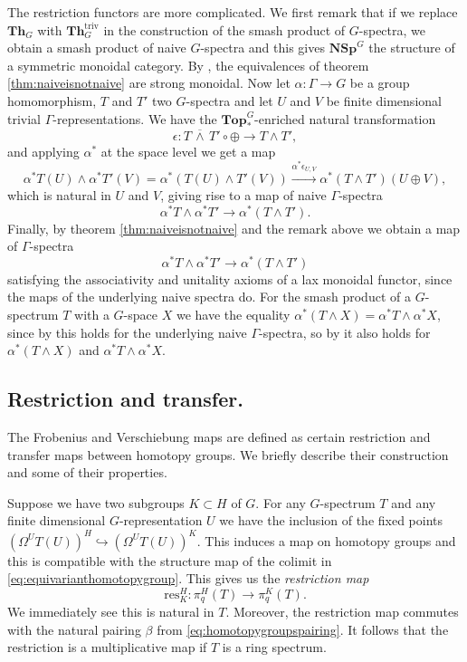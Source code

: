 The restriction functors are more complicated. We first remark that
if we replace $\mathbf{Th}_G$ with $\mathbf{Th}_G^{\mathrm{triv}}$
in the construction of the smash product of $G$-spectra, we obtain
a smash product of naive $G$-spectra and this gives $\mathbf{NSp}^G$
the structure of a symmetric monoidal category. By \cite[Proposition~A.19, \pno~147]{hillhopkinsravenel},
the equivalences of theorem \ref{thm:naiveisnotnaive} are strong monoidal.
Now let $\alpha:\Gamma\to G$ be a group homomorphism,
$T$ and $T'$ two $G$-spectra and let $U$ and $V$ be finite dimensional
trivial $\Gamma$-representations. We have the $\mathbf{Top}_\ast^G$-enriched
natural transformation
\[
\epsilon:T\,\overline{\wedge}\, T'\circ \oplus\to T\wedge T',
\]
and applying $\alpha^\ast$ at the space level we get a map
\[
\alpha^\ast T(U)\wedge \alpha^\ast T'(V) = \alpha^\ast (T(U)\wedge T'(V))
\xrightarrow{\alpha^\ast \epsilon_{U,V}} \alpha^\ast (T\wedge T')(U\oplus V),
\]
which is natural in $U$ and $V$, giving rise to a map of naive $\Gamma$-spectra
\[
\alpha^\ast T\wedge \alpha^\ast T'\to \alpha^\ast (T\wedge T').
\]
Finally, by theorem \ref{thm:naiveisnotnaive} and the remark above
we obtain a map of $\Gamma$-spectra
\[
\alpha^\ast T\wedge \alpha^\ast T'\to \alpha^\ast (T\wedge T')
\]
satisfying the associativity and unitality axioms
of a lax monoidal functor, since the maps of the underlying naive spectra do.
For the smash product of a $G$-spectrum $T$ with a $G$-space $X$
we have the equality $\alpha^\ast (T\wedge X) = \alpha^\ast T\wedge \alpha^\ast X$,
since by \cite[Construction~6.5 \pno~1519]{rvadams}
this holds for the underlying naive $\Gamma$-spectra, so
by \cite[Construction~6.7, \pno~1519]{rvadams} it also holds for 
$\alpha^\ast (T\wedge X)$ and $\alpha^\ast T\wedge \alpha^\ast X$.
\subsection{Restriction and transfer.}
The Frobenius and Verschiebung maps are defined as certain restriction and transfer
maps between homotopy groups. We briefly describe their construction and some of their properties.

Suppose we have two subgroups $K\subset H$ of $G$. For any $G$-spectrum $T$
and any finite dimensional $G$-representation $U$ we have the inclusion of the fixed
points $(\Omega^UT(U))^H\hookrightarrow (\Omega^UT(U))^K$. This induces a map
on homotopy groups and this is compatible with the structure map of the colimit in 
\eqref{eq:equivarianthomotopygroup}. This gives us the \textit{restriction map}
\begin{equation}
\mathrm{res}^H_K: \pi_q^H(T)\to \pi_q^K(T).
\end{equation}
We immediately see this is natural in $T$. Moreover, the restriction map commutes
with the natural pairing $\beta$ from \eqref{eq:homotopygroupspairing}. It follows
that the restriction is a multiplicative map if $T$ is a ring spectrum.

